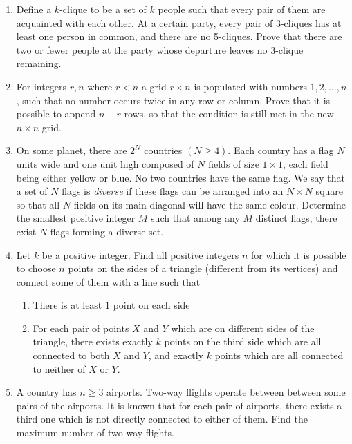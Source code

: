 \documentclass{article}
\begin{document}
\begin{enumerate}
	\item %
	Define a $k$-clique to be a set of $k$ people such that every pair of them are acquainted with each other. At a certain party, every pair of 3-cliques has at least one person in common, and there are no 5-cliques. Prove that there are two or fewer people at the party whose departure leaves no 3-clique remaining.	
	
	\item  %
	For integers $r,n$ where $r<n$ a grid $r \times n$ is populated with numbers $1,2,\dots,n$, such that no number occurs twice in any row or column. Prove that it is possible to append $n-r$ rows, so that the condition is still met in the new $n \times n$ grid.
	
	\item %
	On some planet, there are $2^N$ countries $(N \geq 4)$. Each country has a flag $N$ units wide and one unit high composed of $N$ fields of size $1 \times 1$, each field being either yellow or blue. No two countries have the same flag. We say that a set of $N$ flags is \emph{diverse} if these flags can be arranged into an $N \times N$ square so that all $N$ fields on its main diagonal will have the same colour. Determine the smallest positive integer $M$ such that among any $M$ distinct flags, there exist $N$ flags forming a diverse set.
	
	\item %
	Let $k$ be a positive integer. Find all positive integers $n$ for which it is possible to choose $n$ points on the sides of a triangle (different from its vertices) and connect some of them with a line such that
	\begin{enumerate}
		\item There is at least $1$ point on each side
		\item For each pair of points $X$ and $Y$ which are on different sides of the triangle, there exists exactly $k$ points on the third side which are all connected to both $X$ and $Y$, and exactly $k$ points which are all connected to neither of $X$ or $Y$.
	\end{enumerate}
	
	\item %
	A country has $n \geq 3$ airports. Two-way flights operate between between some pairs of the airports. It is known that for each pair of airports, there exists a third one which is not directly connected to either of them. Find the maximum number of two-way flights.

\end{enumerate}
\end{document}
